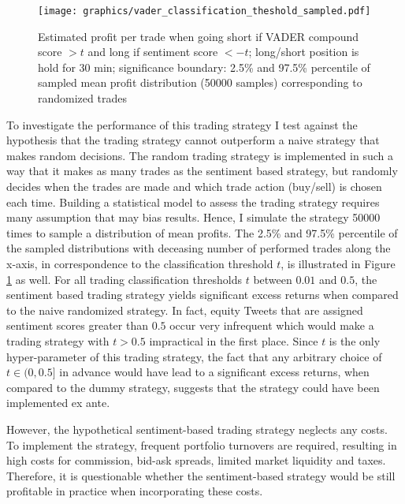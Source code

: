 \documentclass[a4paper,12pt]{article}%
\begin{document}
\begin{figure}
\captionsetup{justification=centering}
\centering
\texttt{[image: graphics/vader\_classification\_theshold\_sampled.pdf]}
\caption[Evaluation of VADER Score Based Trading Strategy]{Estimated profit per trade when going short if VADER compound score $>t$ and long if sentiment score $< -t$; long/short position is hold for 30 min; significance boundary: 2.5\% and 97.5\% percentile of sampled mean profit distribution (50000 samples) corresponding to randomized trades \label{fig:vader_class_threshold}}
\end{figure}

To investigate the performance of this trading strategy I test against the hypothesis that the trading strategy cannot outperform a naive strategy that makes random decisions. The random trading strategy is implemented in such a way that it makes as many trades as the sentiment based strategy, but randomly decides when the trades are made and which trade action (buy/sell) is chosen each time. Building a statistical model to assess the trading strategy requires many assumption that may bias results. Hence, I simulate the strategy 50000 times to sample a distribution of mean profits. The 2.5\% and 97.5\% percentile of the sampled distributions with deceasing number of performed trades along the x-axis, in correspondence to the classification threshold $t$, is illustrated in Figure \ref{fig:vader_class_threshold} as well. 
For all trading classification thresholds $t$ between $0.01$ and $0.5$, the sentiment based trading strategy yields significant excess returns when compared to the naive randomized strategy. In fact, equity Tweets that are assigned sentiment scores greater than $0.5$ occur very infrequent which would make a trading strategy with $t>0.5$ impractical in the first place.
Since $t$ is the only hyper-parameter of this trading strategy, the fact that any arbitrary choice of $t \in (0,0.5]$ in advance would have lead to a significant excess returns, when compared to the dummy strategy, suggests that the strategy could have been implemented ex ante.

However, the hypothetical sentiment-based trading strategy neglects any costs. To implement the strategy, frequent portfolio turnovers are required, resulting in high costs for commission, bid-ask spreads, limited market liquidity and taxes. Therefore, it is questionable whether the sentiment-based strategy would be still profitable in practice when incorporating these costs. 
\end{document}
